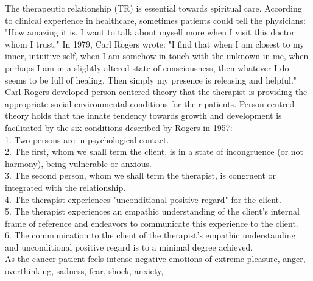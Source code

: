 \documentclass[12pt, a4paper]{article}
\begin{document}
The therapeutic relationship (TR) is essential towards spiritual care.
According to clinical experience in healthcare, sometimes patients could tell the physicians: "How amazing it is. I want to talk about myself more when I visit this doctor whom I trust."
In 1979, Carl Rogers wrote\cite{Rogers1979}: "I find that when I am closest to my inner, intuitive self, when I am somehow in touch with the unknown in me, when perhaps I am in a slightly altered state of consciousness, then whatever I do seems to be full of healing. Then simply my presence is releasing and helpful."
Carl Rogers developed person-centered theory that the therapist is providing the appropriate social-environmental conditions for their patients\cite{Rogers1957}\cite{Joseph2004}\cite{Griffiths2013}.
Person-centred theory holds that the innate tendency towards growth and development is facilitated by the six conditions described by Rogers in 1957\cite{Rogers1957}:\\
1. Two persons are in psychological contact. \\
2. The first, whom we shall term the client, is in a state of incongruence (or not harmony), being vulnerable or anxious. \\
3. The second person, whom we shall term the therapist, is congruent
or integrated with the relationship. \\
4. The therapist experiences "unconditional positive regard" for the client. \\
5. The therapist experiences an empathic understanding of the client's
internal frame of reference and endeavors to communicate this experience to the client. \\
6. The communication to the client of the therapist's empathic understanding and unconditional positive regard is to a minimal degree achieved.\\
As the cancer patient feels intense negative emotions of extreme pleasure, anger, overthinking, sadness, fear, shock, anxiety, 
\end{document}
